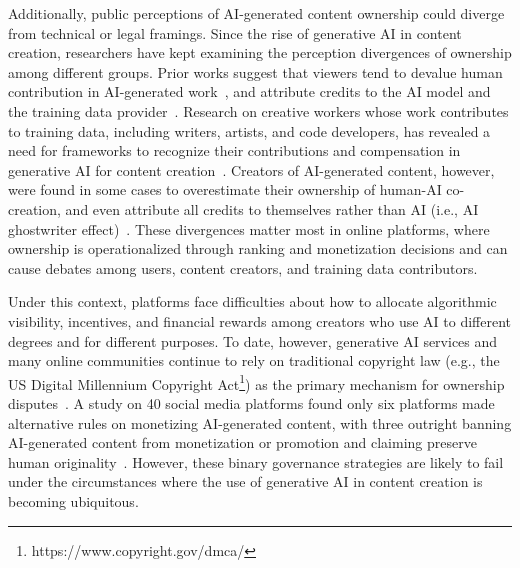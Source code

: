 Additionally, public perceptions of AI-generated content ownership could diverge from technical or legal framings. Since the rise of generative AI in content creation, researchers have kept examining the perception divergences of ownership among different groups. Prior works suggest that viewers tend to devalue human contribution in AI-generated work~\cite{lima2025public, 10.1145/3706598.3713522}, and attribute credits to the AI model and the training data provider~\cite{lima2025public}. Research on creative workers whose work contributes to training data, including writers, artists, and code developers, has revealed a need for frameworks to recognize their contributions and compensation in generative AI for content creation~\cite{Lovato_Zimmerman_Smith_Dodds_Karson_2024, kyi2025governance, gero2025creative}. Creators of AI-generated content, however, were found in some cases to overestimate their ownership of human-AI co-creation, and even attribute all credits to themselves rather than AI (i.e., AI ghostwriter effect)~\cite{kim2025s, 10.1145/3637875}. These divergences matter most in online platforms, where ownership is operationalized through ranking and monetization decisions and can cause debates among users, content creators, and training data contributors.

Under this context, platforms face difficulties about how to allocate algorithmic visibility, incentives, and financial rewards among creators who use AI to different degrees and for different purposes. To date, however, generative AI services and many online communities continue to rely on traditional copyright law (e.g., the US Digital Millennium Copyright Act\footnote{https://www.copyright.gov/dmca/}) as the primary mechanism for ownership disputes~\cite{gao2025cannot,gao2026governance}. A study on 40 social media platforms found only six platforms made alternative rules on monetizing AI-generated content, with three outright banning AI-generated content from monetization or promotion and claiming preserve human originality~\cite{gao2026governance}. However, these binary governance strategies are likely to fail under the circumstances where the use of generative AI in content creation is becoming ubiquitous.

